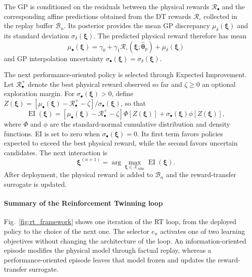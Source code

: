 \documentclass[journal]{IEEEtran}
\begin{document}
The GP is conditioned on the residuals between the physical rewards $\mathcal R_{\bullet}$ and the corresponding affine predictions obtained from the DT rewards $\mathcal R_{\circ}$ collected in the replay buffer $\mathcal B_n$. Its posterior provides the mean GP discrepancy $\mu_{\delta}(\boldsymbol\xi)$ and its standard deviation $\sigma_{\delta}(\boldsymbol\xi)$. The predicted physical reward therefore has mean
\begin{equation}
\mu_{\bullet}(\boldsymbol\xi)=
\gamma_0+
\gamma_1\mathcal R_{\circ}
(\boldsymbol\xi;\widehat{\boldsymbol{\theta}}_p)
+\mu_{\delta}(\boldsymbol\xi)
\label{eq:rt-surrogate-mean}
\end{equation}
and GP interpolation uncertainty $\sigma_{\bullet}(\boldsymbol\xi)=\sigma_{\delta}(\boldsymbol\xi)$.

The next performance-oriented policy is selected through Expected Improvement. Let $\mathcal R_{\bullet}^{+}$ denote the best physical reward observed so far and $\zeta\geq0$ an optional exploration margin. For $\sigma_{\bullet}(\boldsymbol\xi)>0$, define $Z(\boldsymbol\xi)=[\mu_{\bullet}(\boldsymbol\xi)-\mathcal R_{\bullet}^{+}-\zeta]/\sigma_{\bullet}(\boldsymbol\xi)$, so that
\begin{equation}
\operatorname{EI}(\boldsymbol\xi)=
\left[\mu_{\bullet}(\boldsymbol\xi)-\mathcal R_{\bullet}^{+}-\zeta\right]
\Phi\!\left[Z(\boldsymbol\xi)\right]
+
\sigma_{\bullet}(\boldsymbol\xi)
\phi\!\left[Z(\boldsymbol\xi)\right],
\label{eq:rt-expected-improvement}
\end{equation}
where $\Phi$ and $\phi$ are the standard-normal cumulative distribution and density functions. EI is set to zero when $\sigma_{\bullet}(\boldsymbol\xi)=0$. Its first term favors policies expected to exceed the best physical reward, while the second favors uncertain candidates. The next interaction is
\begin{equation}
\boldsymbol\xi^{(n+1)}
=
\arg\max_{\boldsymbol\xi\in\mathcal X_{\mathrm{adm}}}
\operatorname{EI}(\boldsymbol\xi).
\label{eq:rt-next-performance}
\end{equation}
After deployment, the physical reward is added to $\mathcal B_n$ and the reward-transfer surrogate is updated.

\paragraph*{Summary of the Reinforcement Twinning loop}
Fig.~\ref{fig:rt_framework} shows one iteration of the RT loop, from the deployed policy to the choice of the next one. The selector $e_n$ activates one of two learning objectives without changing the architecture of the loop. An information-oriented episode modifies the physical model through factual replay, whereas a performance-oriented episode leaves that model frozen and updates the reward-transfer surrogate.
\end{document}
